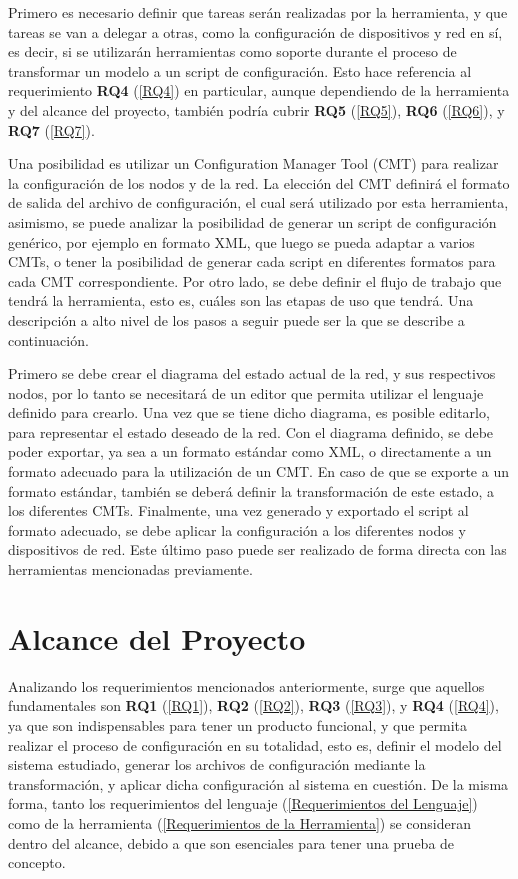 Primero es necesario definir que tareas serán realizadas por la herramienta, y que tareas se van a delegar a otras, como la configuración de dispositivos y red en sí, es decir, si se utilizarán herramientas como soporte durante el proceso de transformar un modelo a un script de configuración. Esto hace referencia al requerimiento \textbf{RQ4} (\ref{RQ4}) en particular, aunque dependiendo de la herramienta y del alcance del proyecto, también podría cubrir \textbf{RQ5} (\ref{RQ5}), \textbf{RQ6} (\ref{RQ6}), y \textbf{RQ7} (\ref{RQ7}).

Una posibilidad es utilizar un Configuration Manager Tool (CMT) para realizar la configuración de los nodos y de la red. La elección del CMT definirá el formato de salida del archivo de configuración, el cual será utilizado por esta herramienta, asimismo, se puede analizar la posibilidad de generar un script de configuración genérico, por ejemplo en formato XML, que luego se pueda adaptar a varios CMTs, o tener la posibilidad de generar cada script en diferentes formatos para cada CMT correspondiente. 
Por otro lado, se debe definir el flujo de trabajo que tendrá la herramienta, esto es, cuáles son las etapas de uso que tendrá. Una descripción a alto nivel de los pasos a seguir puede ser la que se describe a continuación. 

Primero se debe crear el diagrama del estado actual de la red, y sus respectivos nodos, por lo tanto se necesitará de un editor que permita utilizar el lenguaje definido para crearlo. Una vez que se tiene dicho diagrama, es posible editarlo, para representar el estado deseado de la red. Con el diagrama definido, se debe poder exportar, ya sea a un formato estándar como XML, o directamente a un formato adecuado para la utilización de un CMT. En caso de que se exporte a un formato estándar, también se deberá definir la transformación de este estado, a los diferentes CMTs. Finalmente, una vez generado y exportado el script al formato adecuado, se debe aplicar la configuración a los diferentes nodos y dispositivos de red. Este último paso puede ser realizado de forma directa con las herramientas mencionadas previamente.

\section{Alcance del Proyecto}
Analizando los requerimientos mencionados anteriormente, surge que aquellos fundamentales son \textbf{RQ1} (\ref{RQ1}), \textbf{RQ2} (\ref{RQ2}), \textbf{RQ3} (\ref{RQ3}), y \textbf{RQ4} (\ref{RQ4}), ya que son indispensables para tener un producto funcional, y que permita realizar el proceso de configuración en su totalidad, esto es, definir el modelo del sistema estudiado, generar los archivos de configuración mediante la transformación, y aplicar dicha configuración al sistema en cuestión. De la misma forma, tanto los requerimientos del lenguaje (\ref{Requerimientos del Lenguaje}) como de la herramienta (\ref{Requerimientos de la Herramienta}) se consideran dentro del alcance, debido a que son esenciales para tener una prueba de concepto.

